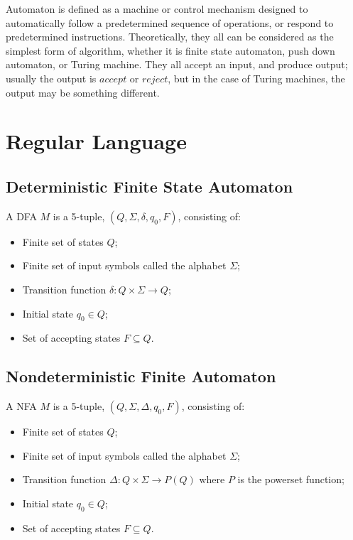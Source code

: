 \documentclass{report}
\begin{document}
	Automaton is defined as a machine or control mechanism designed to automatically follow a predetermined sequence of operations, or respond to predetermined instructions. Theoretically, they all can be considered as the simplest form of algorithm, whether it is finite state automaton, push down automaton, or Turing machine. They all accept an input, and produce output; usually the output is $accept$ or $reject$, but in the case of Turing machines, the output may be something different.
	\section{Regular Language}
		\subsection{Deterministic Finite State Automaton}
			\begin{defn} \label{def_DFA}
				A DFA $M$ is a 5-tuple, $(Q,\Sigma,\delta,q_0,F)$, consisting of:
				\begin{itemize}
					\item Finite set of states $Q$;
					\item Finite set of input symbols called the alphabet $\Sigma$;
					\item Transition function $\delta:Q \times \Sigma \rightarrow Q$;
					\item Initial state $q_0 \in Q$;
					\item Set of accepting states $F \subseteq Q$.
				\end{itemize}
			\end{defn}
		
		\subsection{Nondeterministic Finite Automaton}
			\begin{defn} \label{def_NFA}
				A NFA $M$ is a 5-tuple, $(Q,\Sigma,\Delta,q_0,F)$, consisting of:
				\begin{itemize}
					\item Finite set of states $Q$;
					\item Finite set of input symbols called the alphabet $\Sigma$;
					\item Transition function $\Delta: Q \times \Sigma \rightarrow P(Q)$ where $P$ is the powerset function;
					\item Initial state $q_0 \in Q$;
					\item Set of accepting states $F \subseteq Q$.
				\end{itemize}
			\end{defn}
		
\end{document}
